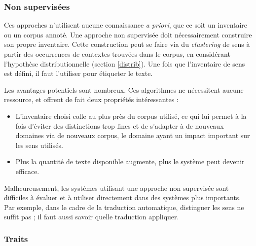 \subsubsection{Non supervisées}

Ces approches n'utilisent aucune connaissance \textit{a priori}, que ce soit un
inventaire ou un corpus annoté. Une approche non supervisée doit nécessairement
construire son propre inventaire. Cette construction peut se faire via du
\textit{clustering} de sens à partir des occurrences de contextes trouvées dans
le corpus, en considérant l'hypothèse distributionnelle (section
\ref{distrib}). Une fois que l'inventaire de sens est défini, il faut
l'utiliser pour étiqueter le texte.

Les avantages potentiels sont nombreux. Ces algorithmes ne nécessitent aucune
ressource, et offrent de fait deux propriétés intéressantes :

\begin{itemize}

    \item L'inventaire choisi colle au plus près du corpus utilisé, ce qui lui
        permet à la fois d'éviter des distinctions trop fines et de s'adapter à
        de nouveaux domaines via de nouveaux corpus, le domaine ayant un impact
        important sur les sens utilisés.

    \item Plus la quantité de texte disponible augmente, plus le système peut
        devenir efficace.

\end{itemize}

Malheureusement, les systèmes utilisant une approche non supervisée sont
difficiles à évaluer et à utiliser directement dans des systèmes plus
importants. Par exemple, dans le cadre de la traduction automatique, distinguer
les sens ne suffit pas ; il faut aussi savoir quelle traduction appliquer.

\subsubsection{Traits}

